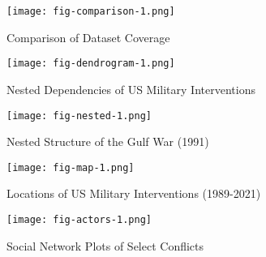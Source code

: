 \documentclass[fleqn,12pt]{article}
\begin{document}
\clearpage
{}
\newpage
\begin{figure}[h]
	\begin{center}
		\caption{Comparison of Dataset Coverage}
		{\texttt{[image: fig-comparison-1.png]}}
		\label{fig:fig-comparison-1}
		\vspace{0.1 in}
	\end{center}
\end{figure}

\clearpage
{}
\newpage
\begin{figure}[h]
	\begin{center}
		\caption{Nested Dependencies of US Military Interventions}
		{\texttt{[image: fig-dendrogram-1.png]}}
		\label{fig:fig-dendrogram-1}
		\vspace{0.1 in}
	\end{center}
\end{figure}

\clearpage
{}
\newpage
\begin{figure}[h]
	\begin{center}
		\caption{Nested Structure of the Gulf War (1991)}
		{\texttt{[image: fig-nested-1.png]}}
		\label{fig:fig-nested-1}
		\vspace{0.1 in}
	\end{center}
\end{figure}

\clearpage
{}
\newpage
\begin{figure}[h]
	\begin{center}
		\caption{Locations of US Military Interventions (1989-2021)}
		{\texttt{[image: fig-map-1.png]}}
		\label{fig:fig-map-1}
		\vspace{0.1 in}
	\end{center}
\end{figure}

\clearpage
{}
\newpage
\begin{figure}[h]
	\begin{center}
		\caption{Social Network Plots of Select Conflicts}
		{\texttt{[image: fig-actors-1.png]}}
		\label{fig:fig-actors-1}
		\vspace{0.1 in}
	\end{center}
\end{figure}

\clearpage
\newpage

\end{document}
